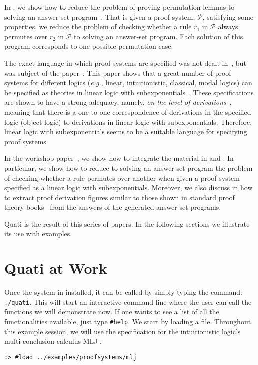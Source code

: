 \documentclass{llncs}
\newcommand\Pscr{\mathcal{P}}
\newcommand{\eg}{{\em e.g.}}
\begin{document}
In \cite{nigam13iclp}, we show how to reduce the problem of proving permutation
lemmas to solving an answer-set program~\cite{gelfond}. That is given a proof
system, $\Pscr$, satisfying some properties, we reduce the problem 
of checking whether a rule $r_1$ in $\Pscr$ always permutes over $r_2$ in
$\Pscr$ to solving an answer-set program. Each solution of this program
corresponds to one possible permutation case. 

The exact language in which proof systems are specified was not dealt
in~\cite{nigam13iclp}, but was subject of the paper~\cite{nigam.jlc}. This paper
shows that a great number of proof systems for different logics (\eg, linear,
intuitionistic, classical, modal logics) can be specified as theories in linear
logic with subexponentials~\cite{nigam09ppdp}. These specifications are shown to
have a strong adequacy, namely, \emph{on the level of
derivations}~\cite{nigam10jar}, meaning that there is a one to one
correspondence of derivations in the specified logic (object logic) to derivations in linear
logic with subexponentials. Therefore, linear logic with subexponentials seems
to be a suitable language for specifying proof systems. 

In the workshop paper~\cite{nigam14ebl}, we show how to integrate the material
in \cite{nigam13iclp} and \cite{nigam.jlc}. In particular, we show how to reduce
to solving an answer-set program the problem of checking whether a rule permutes
over another when given a proof system specified as a linear logic with
subexponentials. Moreover, we also discuss in \cite{nigam14ebl} how to extract
proof derivation figures similar to those shown in standard proof theory
books~\cite{troelstra} from the answers of the generated answer-set programs. 

Quati is the result of this series of papers. In the following sections we illustrate its use 
with examples.

\section{Quati at Work}


Once the system in installed, it can be called by simply typing the command:
\texttt{./quati}. This will start an interactive command line where the user can
call the functions we will demonstrate now. If one wants to see a list of all
the functionalities available, just type \texttt{\#help}. We start by loading a
file. Throughout this example session, we will use the specification for the
intuitionistic logic's multi-conclusion calculus MLJ \cite{maehara}.
%
{\scriptsize
\begin{verbatim}
:> #load ../examples/proofsystems/mlj
\end{verbatim}
}
\end{document}
